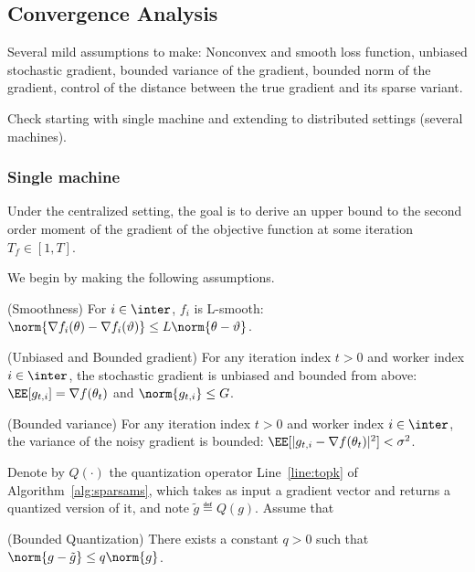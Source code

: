 \documentclass[11pt]{article}
\begin{document}
\subsection{Convergence Analysis}

Several mild assumptions to make: Nonconvex and smooth loss function, unbiased stochastic gradient, bounded variance of the gradient, bounded norm of the gradient, control of the distance between the true gradient and its sparse variant.

Check \citep{chen2020quantized} starting with single machine  and extending to distributed settings (several machines).

\subsubsection{Single machine}
Under the centralized setting, the goal is to derive an upper bound to the second order moment of the gradient of the objective function at some iteration $T_f \in [1, T]$.

We begin by making the following assumptions.

\begin{assumption}\label{ass:smooth}(Smoothness)
For $i \in \inter$, $f_i$ is  L-smooth: $\norm{\nabla f_i (\theta) - \nabla f_i (\vartheta)} \leq L \norm{\theta-\vartheta}$.
\end{assumption}

\begin{assumption}\label{ass:boundgrad}(Unbiased and Bounded gradient)
For any iteration index $t >0$ and worker index $i \in \inter$, the stochastic gradient is unbiased and bounded from above: $\EE[g_{t,i}] = \nabla f(\theta_t)$ and $\norm{g_{t,i}} \leq G$.
\end{assumption}

\begin{assumption}\label{ass:quant}(Bounded variance)
For any iteration index $t >0$ and worker index $i \in \inter$, the variance of the noisy gradient is bounded: $\EE[|g_{t,i} - \nabla f(\theta_t)|^2] < \sigma^2$.
\end{assumption}

Denote by $Q(\cdot)$ the quantization operator Line~\ref{line:topk} of Algorithm~\ref{alg:sparsams}, which takes as input a gradient vector and returns a quantized version of it, and note $\tilde{g} \eqdef Q(g)$.
Assume that
\begin{assumption}\label{ass:var}(Bounded Quantization)
There exists a constant $q >0$ such that $\norm{g - \tilde{g}} \leq q \norm{g}$.
\end{assumption}
\end{document}
